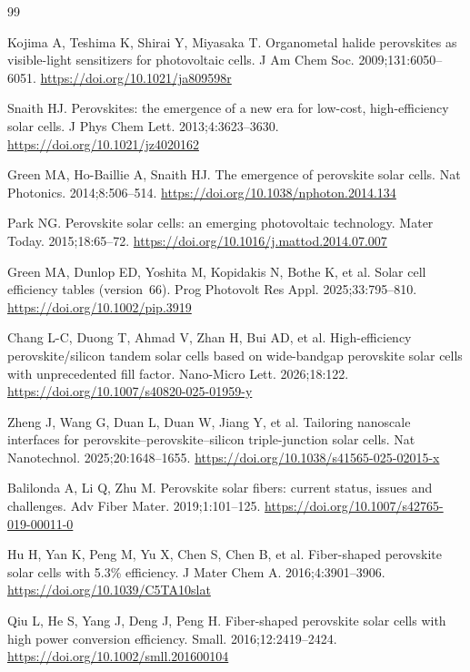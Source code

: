 \documentclass[pdflatex,sn-mathphys-num,iicol]{sn-jnl}
\theoremstyle{thmstyleone}
\theoremstyle{thmstyletwo}
\theoremstyle{thmstylethree}
\begin{document}
\begin{thebibliography}{99}

Kojima A, Teshima K, Shirai Y, Miyasaka T.
Organometal halide perovskites as visible-light sensitizers for
photovoltaic cells.
J Am Chem Soc. 2009;131:6050--6051.
\url{https://doi.org/10.1021/ja809598r}

Snaith HJ.
Perovskites: the emergence of a new era for low-cost, high-efficiency
solar cells.
J Phys Chem Lett. 2013;4:3623--3630.
\url{https://doi.org/10.1021/jz4020162}

Green MA, Ho-Baillie A, Snaith HJ.
The emergence of perovskite solar cells.
Nat Photonics. 2014;8:506--514.
\url{https://doi.org/10.1038/nphoton.2014.134}

Park NG.
Perovskite solar cells: an emerging photovoltaic technology.
Mater Today. 2015;18:65--72.
\url{https://doi.org/10.1016/j.mattod.2014.07.007}

Green MA, Dunlop ED, Yoshita M, Kopidakis N, Bothe K, et al.
Solar cell efficiency tables (version~66).
Prog Photovolt Res Appl. 2025;33:795--810.
\url{https://doi.org/10.1002/pip.3919}

Chang L-C, Duong T, Ahmad V, Zhan H, Bui AD, et al.
High-efficiency perovskite/silicon tandem solar cells based on
wide-bandgap perovskite solar cells with unprecedented fill factor.
Nano-Micro Lett. 2026;18:122.
\url{https://doi.org/10.1007/s40820-025-01959-y}

Zheng J, Wang G, Duan L, Duan W, Jiang Y, et al.
Tailoring nanoscale interfaces for perovskite--perovskite--silicon
triple-junction solar cells.
Nat Nanotechnol. 2025;20:1648--1655.
\url{https://doi.org/10.1038/s41565-025-02015-x}

Balilonda A, Li Q, Zhu M.
Perovskite solar fibers: current status, issues and challenges.
Adv Fiber Mater. 2019;1:101--125.
\url{https://doi.org/10.1007/s42765-019-00011-0}

Hu H, Yan K, Peng M, Yu X, Chen S, Chen B, et al.
Fiber-shaped perovskite solar cells with 5.3\% efficiency.
J Mater Chem A. 2016;4:3901--3906.
\url{https://doi.org/10.1039/C5TA10slat}

Qiu L, He S, Yang J, Deng J, Peng H.
Fiber-shaped perovskite solar cells with high power conversion efficiency.
Small. 2016;12:2419--2424.
\url{https://doi.org/10.1002/smll.201600104}


\end{thebibliography}
\end{document}

